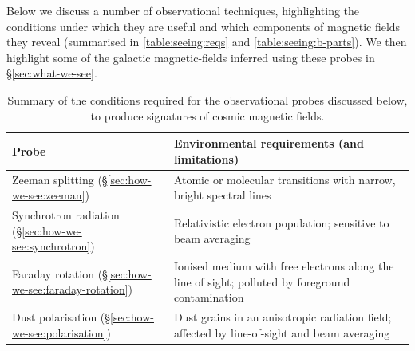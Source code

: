 \documentclass[12pt,twoside]{extreport}
\providecommand{\DIFaddbeginFL}{} %
\providecommand{\DIFaddendFL}{} %
\providecommand{\DIFdelbeginFL}{} %
\providecommand{\DIFdelendFL}{} %
\providecommand{\DIFscaledelfig}{0.5}
\newlength{\DIFdelgraphicswidth} %
\newlength{\DIFdelgraphicsheight} %
\providecommand{\DIFaddincludegraphics}[2][]{{\color{DIFgreen}\fbox{\DIFOincludegraphics[#1]{#2}}}} %
\providecommand{\DIFdelincludegraphics}[2][]{%
\sbox{\DIFdelgraphicsbox}{\DIFOincludegraphics[#1]{#2}}%
\settoboxwidth{\DIFdelgraphicswidth}{\DIFdelgraphicsbox} %
\settoboxtotalheight{\DIFdelgraphicsheight}{\DIFdelgraphicsbox} %
\scalebox{\DIFscaledelfig}{%
\parbox[b]{\DIFdelgraphicswidth}{\usebox{\DIFdelgraphicsbox}\\[-\baselineskip] \rule{\DIFdelgraphicswidth}{0em}}\llap{\resizebox{\DIFdelgraphicswidth}{\DIFdelgraphicsheight}{%
\setlength{\unitlength}{\DIFdelgraphicswidth}%
\begin{picture}(1,1)%
\thicklines\linethickness{2pt} %
{\color{DIFpurple}\put(0,0){\framebox(1,1){}}}%
{\color{DIFpurple}\put(0,0){\line( 1,1){1}}}%
{\color{DIFpurple}\put(0,1){\line(1,-1){1}}}%
\end{picture}%
}\hspace*{3pt}}} %
} %
\DeclareRobustCommand{\DIFaddbeginFL}{\DIFOaddbeginFL \let\includegraphics\DIFaddincludegraphics} %
\DeclareRobustCommand{\DIFaddendFL}{\DIFOaddendFL \let\includegraphics\DIFOincludegraphics} %
\DeclareRobustCommand{\DIFdelbeginFL}{\DIFOdelbeginFL \let\includegraphics\DIFdelincludegraphics} %
\DeclareRobustCommand{\DIFdelendFL}{\DIFOaddendFL \let\includegraphics\DIFOincludegraphics} %
\begin{document}
Below we discuss a number of observational techniques, highlighting the conditions under which they are useful and which components of magnetic fields they reveal (summarised in \autoref{table:seeing:reqs} and \ref{table:seeing:b-parts}). We then highlight some of the galactic magnetic-fields inferred using these probes in \S\ref{sec:what-we-see}.

\begin{table}
\centering
\caption{Summary of the conditions required for the observational probes discussed below, to produce signatures of cosmic magnetic fields.}
\label{table:seeing:reqs}
\DIFdelbeginFL %
\DIFdelendFL \DIFaddbeginFL \renewcommand{\arraystretch}{1.65}
\DIFaddendFL \begin{tabular}{>{\raggedright\arraybackslash}p{} p{}}
    \hline
    Probe & Environmental requirements (and limitations) \\
    \hline
    Zeeman splitting (\S\ref{sec:how-we-see:zeeman})
    & Atomic or molecular transitions with narrow, bright spectral lines \\

    Synchrotron radiation (\S\ref{sec:how-we-see:synchrotron})
    & Relativistic electron population; sensitive to beam averaging \\

    Faraday rotation (\S\ref{sec:how-we-see:faraday-rotation})
    & Ionised medium with free electrons along the line of sight; polluted by foreground contamination \\

    Dust polarisation (\S\ref{sec:how-we-see:polarisation})
    & Dust grains in an anisotropic radiation field; affected by line-of-sight and beam averaging \\
    \hline
\end{tabular}
\end{table}
\end{document}
